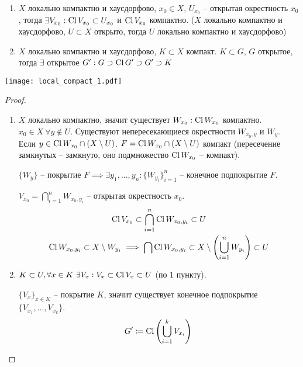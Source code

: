 \documentclass[main]{subfiles}
\begin{document}
\begin{theorem}
    \

    \begin{enumerate}
        \item $X$ локально компактно и хаусдорфово, $x_0 \in X$, $U_{x_0}$ -- открытая окрестность $x_0$,
              тогда $\exists V_{x_0}: \operatorname{Cl} V_{x_0} \subset U_{x_0}$ и $\operatorname{Cl} V_{x_0}$ компактно.
              ($X$ локально компактно и хаусдорфово, $U \subset X$ открыто, тогда $U$ локально компактно и хаусдорфово)
        \item $X$ локально компактно и хаусдорфово, $K \subset X$ компакт.
              $K \subset G$, $G$ открытое, тогда $\exists$ открытое $G': G \supset \operatorname{Cl} G' \supset G' \supset K$
    \end{enumerate}
    \begin{center}
        \texttt{[image: local\_compact\_1.pdf]}
    \end{center}
\end{theorem}
\begin{proof}
    \

    \begin{enumerate}
        \item $X$ локально компактно, значит существует $W_{x_0}: \operatorname{Cl} W_{x_0}$ компактно.
              $x_0 \in X\ \forall y \notin U$.
              Существуют непересекающиеся окрестности $W_{x_0,y}$ и $W_y$.
              Если $y \in \operatorname{Cl} W_{x_0} \cap (X \setminus U)$.
              $F = \operatorname{Cl} W_{x_0} \cap (X \setminus U)$ компакт (пересечение замкнутых -- замкнуто, оно подмножество $\operatorname{Cl} W_{x_0}$ -- компакт).

              $\{W_y\}$ -- покрытие $F \implies \exists y_1, ..., y_n: \{W_{y_i}\}_{i=1}^n$ -- конечное подпокрытие $F$.

              $V_{x_0} = \bigcap_{i=1}^n W_{x_0,y_i}$ -- открытая окрестность $x_0$.
              \begin{gather*}
                  \operatorname{Cl} V_{x_0} \subset \bigcap_{i=1}^n \operatorname{Cl} W_{x_0, y_i} \subset U\\
                  \operatorname{Cl} W_{x_0, y_i} \subset X \setminus W_{y_i} \implies \bigcap \operatorname{Cl} W_{x_0, y_i} \subset X \setminus \left(\bigcup_{i=1}^n W_{y_i}\right) \subset U
              \end{gather*}
        \item $K \subset U, \forall x \in K \ \exists V_x: V_x \subset \operatorname{Cl} V_x \subset U$ (по 1 пункту).

              $\{V_x\}_{x \in K}$ -- покрытие $K$, значит существует конечное подпокрытие $\{V_{x_1}, ..., V_{x_k}\}$.
              \[G' \coloneqq \operatorname{Cl} \left(\bigcup_{i=1}^k V_{x_i}\right) \qedhere\]
    \end{enumerate}
\end{proof}
\end{document}

